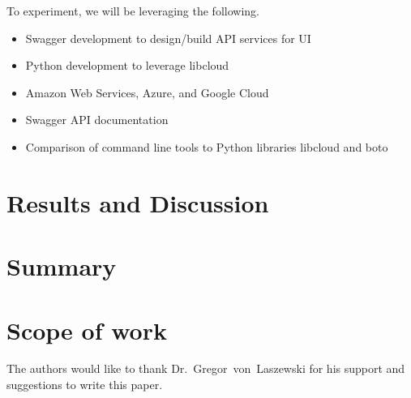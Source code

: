 To experiment, we will be leveraging the following.

\begin{itemize}
    \item
    Swagger development to design/build API services for UI
  \item
    Python development to leverage libcloud
  \item
    Amazon Web Services, Azure, and Google Cloud
  \end{itemize}

\begin{itemize}
\item
  Swagger API documentation
\item
  Comparison of command line tools to Python libraries libcloud and boto
\end{itemize}


\section{Results and Discussion}



\section{Summary}

\section{Scope of work}\label{scope-of-work}

\begin{acks}

  The authors would like to thank Dr.~Gregor~von~Laszewski for his
  support and suggestions to write this paper.

\end{acks}


 

